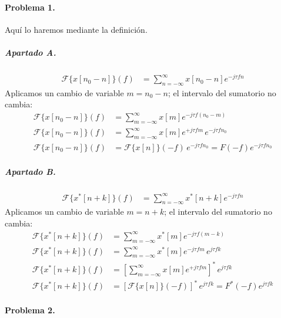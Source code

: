 


\startpage

\paragraph{Problema 1.}

Aquí lo haremos mediante la definición.

\subparagraph{Apartado A.}

\begin{align*}
  \mathcal{F}\{ x[n_0 - n] \}(f)
  &= \sum_{n = -\infty}^{\infty} x[n_0 - n] e^{-j\tau f n}
\end{align*}
%
Aplicamos un cambio de variable $m = n_0 - n$; el intervalo del sumatorio no
cambia:
%
\begin{align*}
  \mathcal{F}\{ x[n_0 - n] \}(f)
  &= \sum_{m = -\infty}^{\infty} x[m] e^{-j\tau f \left( n_0 - m \right) }
\\
  \mathcal{F}\{ x[n_0 - n] \}(f)
  &= \sum_{m = -\infty}^{\infty} x[m] e^{+j\tau f m }
    \, e^{-j\tau f n_0 }
\\
  \mathcal{F}\{ x[n_0 - n] \}(f)
  &= \mathcal{F}\{ x[n] \}(-f) \, e^{-j\tau f n_0 } = F(-f) e^{-j\tau f n_0 }
\end{align*}

\subparagraph{Apartado B.}

\begin{align*}
  \mathcal{F}\{ x^*[n + k] \}(f)
  &= \sum_{n = -\infty}^{\infty} x^*[n + k] e^{-j\tau f n}
\end{align*}
%
Aplicamos un cambio de variable $m = n + k$; el intervalo del sumatorio no
cambia:
%
\begin{align*}
  \mathcal{F}\{ x^*[n + k] \}(f)
  &= \sum_{m = -\infty}^{\infty} x^*[m] e^{-j\tau f \left( m - k \right) }
\\
  \mathcal{F}\{ x^*[n + k] \}(f)
  &= \sum_{m = -\infty}^{\infty} x^*[m] e^{-j\tau f m }
    \, e^{j\tau f k }
\\
  \mathcal{F}\{ x^*[n + k] \}(f)
  &= \left[ \sum_{m = -\infty}^{\infty} x[m] e^{+j\tau f m } \right]^*
    \, e^{j\tau f k }
\\
  \mathcal{F}\{ x^*[n + k] \}(f)
  &= \left[ \mathcal{F}\{ x[n] \}(-f) \right]^*
    \, e^{j\tau f k } = F^*(-f) e^{j\tau f k }
\end{align*}

\finishpage
\startpage

\paragraph{Problema 2.}

